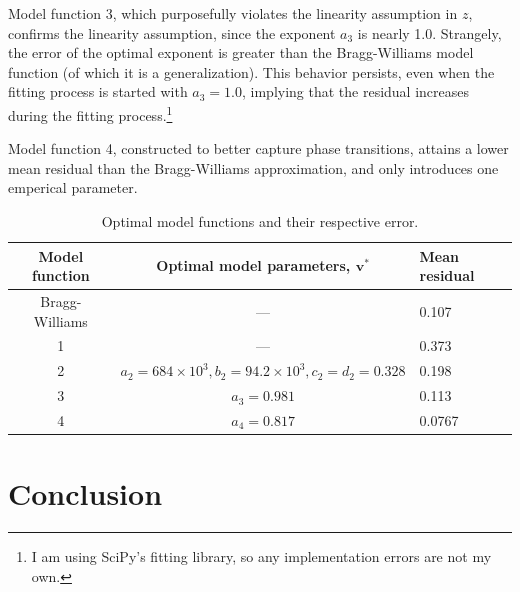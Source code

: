 \documentclass[10pt]{article}
\begin{document}
Model function 3, which purposefully violates the linearity assumption in $z$, confirms the linearity assumption, since the exponent $a_3$ is nearly 1.0. Strangely, the error of the optimal exponent is greater than the Bragg-Williams model function (of which it is a generalization). This behavior persists, even when the fitting process is started with $a_3 = 1.0$, implying that the residual increases during the fitting process.\footnote{I am using SciPy's fitting library, so any implementation errors are not my own.}

Model function 4, constructed to better capture phase transitions, attains a lower mean residual than the Bragg-Williams approximation, and only introduces one emperical parameter.

\begin{table}[h!]
    \caption{Optimal model functions and their respective error.}
    \begin{center}
    \begin{tabular}{c | c | l} 
        \hline
        \textbf{Model function} & \textbf{Optimal model parameters,} $\mathbf{v}^*$ & \textbf{Mean residual} \\  \hline
        Bragg-Williams & --- & 0.107 \\ \hline
        1 & --- & 0.373 \\ \hline
        2 & $a_2=684 \times 10^3, b_2=94.2 \times 10^3, c_2=d_2=0.328$ & 0.198 \\ \hline
        3 & $a_3 = 0.981$ & 0.113 \\ \hline
        4 & $a_4 = 0.817$ & 0.0767
        \label{tbl:model_errors}
    \end{tabular}
    \end{center}
\end{table}


\section{Conclusion}
\end{document}
